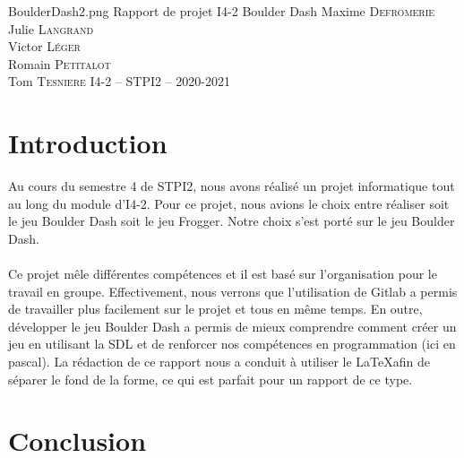 \documentclass[11pt,a4paper]{article}
\begin{document}
\PageDeGarde	
{BoulderDash2.png} %
{Rapport de projet I4-2} %
{Boulder Dash} %
{Maxime \textsc{Defromerie}\\
Julie \textsc{Langrand}\\
Victor \textsc{Léger}\\
Romain \textsc{Petitalot}\\
Tom \textsc{Tesniere}} %
{I4-2 – STPI2 – 2020-2021} %


\tableofcontents

\clearpage %
\section*{Introduction} %

    Au cours du semestre 4 de STPI2, nous avons réalisé un projet informatique tout au long du module d'I4-2. Pour ce projet, nous avions le choix entre réaliser soit le jeu Boulder Dash soit le jeu Frogger. Notre choix s'est porté sur le jeu Boulder Dash.
    \paragraph{} Ce projet mêle différentes compétences et il est basé sur l'organisation pour le travail en groupe. Effectivement, nous verrons que l'utilisation de Gitlab a permis de travailler plus facilement sur le projet et tous en même temps. En outre, développer le jeu Boulder Dash a permis de mieux comprendre comment créer un jeu en utilisant la SDL et de renforcer nos compétences en programmation (ici en pascal). La rédaction de ce rapport nous a conduit à utiliser le \LaTeX  afin de séparer le fond de la forme, ce qui est parfait pour un rapport de ce type.


\clearpage %




\clearpage %

\section{Conclusion}
\end{document}
